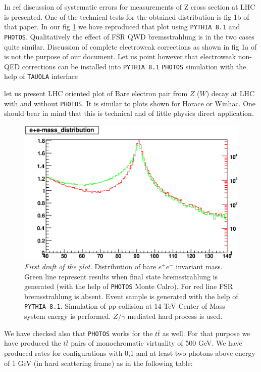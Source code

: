 \documentclass[]{Photos_interface_design}
\begin{document}
In ref \cite{Adam:2008ge} discussion of systematic errors for measurements of Z cross 
section at LHC is presented. One of the technical tests for the obtained 
distribution is fig 1b of that paper. In our fig \ref{fig:lineshape} we have 
reproduced that plot using {\tt PYTHIA 8.1} and {\tt PHOTOS}. Qualitatively the effect
of FSR QWD bremsstrahlung is in the two cases quite similar. Discussion
of complete electroweak corrections as shown in fig 1a of  \cite{Adam:2008ge}
is not the purpose of our document. Let us point however that electroweak 
non-QED corrections can be installed into {\tt PYTHIA 8.1} {\tt PHOTOS} simulation with 
the help of {\tt TAUOLA} interface \cite{Davidson:2010rw}

let us present LHC oriented plot of Bare electron pair from $Z$ ($W$) decay 
at LHC 
with and without {\tt PHOTOS}. It is similar to plots shown for Horace or Winhac. 
One should bear in mind that this is technical and of little physics direct 
application.
\begin{figure}[h!]
\centering
\includegraphics[scale=0.85]{lineshape.eps}
\caption{{\it First draft of the plot.} Distribution of bare $e^+e^-$ invariant mass. Green line represent results when final state 
bremsstrahlung is generated (with the help of {\tt PHOTOS} Monte Calro). For red line FSR 
bremsstrahlung is absent. Event sample is generated with the help of {\tt PYTHIA 8.1}.
Simulation of pp collision at 14 TeV Center of Mass system energy is performed.
$Z/\gamma$ mediated hard process is used.
  \label{fig:lineshape}
}
\end{figure}

We have checked also that {\tt PHOTOS} works for the $t \bar t$ as well.
For that purpose we have produced the  $t \bar t$ pairs of monochromatic 
virtuality of 500 GeV. We have produced rates for configurations with 0,1 and 
at least two photons above energy of 1 GeV (in hard scattering frame)
as in the following table:
\end{document}
